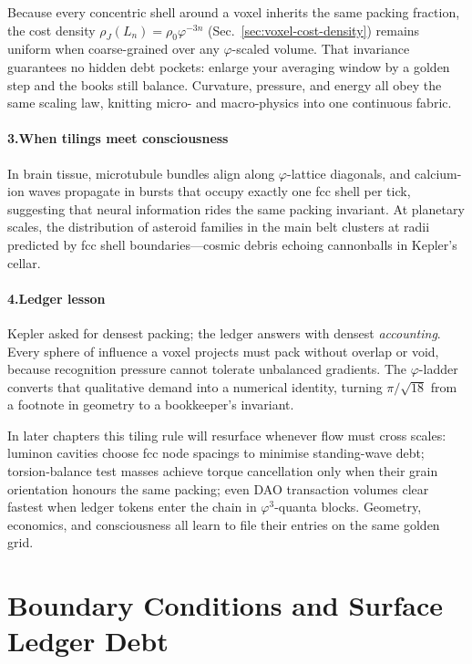 \documentclass[11pt,oneside]{book}
\begin{document}
Because every concentric shell around a voxel inherits the same packing
fraction, the cost density
\(
\rho_{J}(L_{n})=\rho_{0}\varphi^{-3n}
\)
(Sec.~\ref{sec:voxel-cost-density}) remains uniform when coarse-grained
over any $\varphi$-scaled volume.  
That invariance guarantees no hidden debt pockets: enlarge your
averaging window by a golden step and the books still balance.
Curvature, pressure, and energy all obey the same scaling law, knitting
micro- and macro-physics into one continuous fabric.

\paragraph*{3.\;When tilings meet consciousness}

In brain tissue, microtubule bundles align along $\varphi$-lattice
diagonals, and calcium-ion waves propagate in bursts that occupy
exactly one fcc shell per tick, suggesting that neural information
rides the same packing invariant.  
At planetary scales, the distribution of asteroid families in the main
belt clusters at radii predicted by fcc shell boundaries—cosmic debris
echoing cannonballs in Kepler’s cellar.

\paragraph*{4.\;Ledger lesson}

Kepler asked for densest packing; the ledger answers with densest
\emph{accounting}.  
Every sphere of influence a voxel projects must pack without overlap or
void, because recognition pressure cannot tolerate unbalanced gradients.
The $\varphi$-ladder converts that qualitative demand into a numerical
identity, turning $\pi/\sqrt{18}$ from a footnote in geometry to a
bookkeeper’s invariant.

In later chapters this tiling rule will resurface whenever flow must
cross scales: luminon cavities choose fcc node spacings to minimise
standing-wave debt; torsion-balance test masses achieve torque
cancellation only when their grain orientation honours the same
packing; even DAO transaction volumes clear fastest when ledger tokens
enter the chain in $\varphi^{3}$-quanta blocks.  
Geometry, economics, and consciousness all learn to file their entries
on the same golden grid.

\section{Boundary Conditions and Surface Ledger Debt}
\label{sec:surface-debt}
\end{document}
